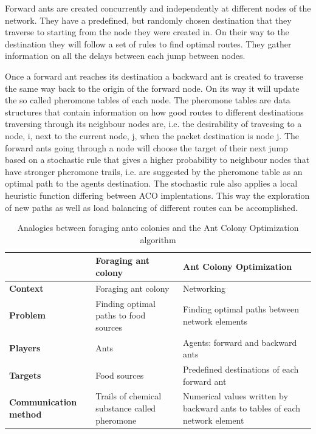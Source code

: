 \documentclass[cameraready]{IWORK2014}
\begin{document}
Forward ants are created concurrently and independently at different nodes of the network. They have a predefined, but randomly chosen destination that they traverse to starting from the node they were created in. On their way to the destination they will follow a set of rules to find optimal routes. They gather information on all the delays between each jump between nodes.

Once a forward ant reaches its destination a backward ant is created to traverse the same way back to the origin of the forward node. On its way it will update the so called pheromone tables of each node. The pheromone tables are data structures that contain information on how good routes to different destinations traversing through its neighbour nodes are, i.e. the desirability of travesing to a node, i, next to the current node, j, when the packet destination is node j. The forward ants going through a node will choose the target of their next jump based on a stochastic rule that gives a higher probability to neighbour nodes that have stronger pheromone trails, i.e. are suggested by the pheromone table as an optimal path to the agents destination. The stochastic rule also applies a local heuristic function differing between ACO implentations. This way the exploration of new paths as well as load balancing of different routes can be accomplished.

\begin{table}
	\begin{tabularx}{0.90\textwidth}{|X|X|X|}
		\hline & \textbf{Foraging ant colony} & \textbf{Ant Colony Optimization} \\ \hline
		\textbf{Context} & Foraging ant colony & Networking \\ \hline
		\textbf{Problem} & Finding optimal paths to food sources & Finding optimal paths between network elements \\ \hline
		\textbf{Players} & Ants & Agents: forward and backward ants \\ \hline
		\textbf{Targets} & Food sources & Predefined destinations of each forward ant \\ \hline
		\textbf{Communication method} & Trails of chemical substance called pheromone & Numerical values written by backward ants to tables of each network element \\ \hline
	\end{tabularx}
	\caption{Analogies between foraging anto colonies and the Ant Colony Optimization algorithm}
	\label{tbl:analogies_ant}
\end{table}
\end{document}
